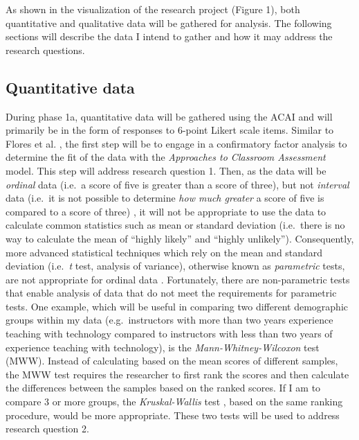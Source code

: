\documentclass[
]{book}
\begin{document}
As shown in the visualization of the research project (Figure 1), both quantitative and qualitative data will be gathered for analysis. The following sections will describe the data I intend to gather and how it may address the research questions.

\hypertarget{quantitative-data}{%
\subsection{Quantitative data}\label{quantitative-data}}

During phase 1a, quantitative data will be gathered using the ACAI and will primarily be in the form of responses to 6-point Likert scale items. Similar to Flores et al. \citeyearpar{floresPortugueseUniversityStudents2020}, the first step will be to engage in a confirmatory factor analysis to determine the fit of the data with the \emph{Approaches to Classroom Assessment} model. This step will address research question 1. Then, as the data will be \emph{ordinal} data (i.e.~a score of five is greater than a score of three), but not \emph{interval} data (i.e.~it is not possible to determine \emph{how much greater} a score of five is compared to a score of three) \citep{bulutLikertScalesFriend2021, jamiesonLikertScalesHow2004}, it will not be appropriate to use the data to calculate common statistics such as mean or standard deviation (i.e.~there is no way to calculate the mean of ``highly likely'' and ``highly unlikely''). Consequently, more advanced statistical techniques which rely on the mean and standard deviation (i.e.~\emph{t} test, analysis of variance), otherwise known as \emph{parametric} tests, are not appropriate for ordinal data \citep{fieldDiscoveringStatisticsUsing2018}. Fortunately, there are non-parametric tests that enable analysis of data that do not meet the requirements for parametric tests. One example, which will be useful in comparing two different demographic groups within my data (e.g.~instructors with more than two years experience teaching with technology compared to instructors with less than two years of experience teaching with technology), is the \emph{Mann-Whitney-Wilcoxon} test \citep{gaoNonparametricStatistics2010} (MWW). Instead of calculating based on the mean scores of different samples, the MWW test requires the researcher to first rank the scores and then calculate the differences between the samples based on the ranked scores. If I am to compare 3 or more groups, the \emph{Kruskal-Wallis} test \citep{gaoNonparametricStatistics2010}, based on the same ranking procedure, would be more appropriate. These two tests will be used to address research question 2.
\end{document}
